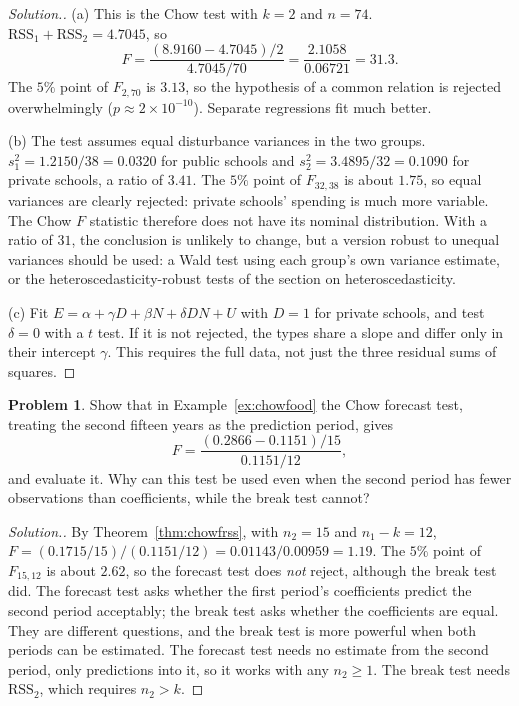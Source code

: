 \documentclass[11pt,a4paper]{article}
\numberwithin{equation}{section}
\theoremstyle{definition}
\newtheorem{problemx}{Problem}[subsection]
\newenvironment{problem}{\begin{problemx}}{\end{problemx}}
\newenvironment{solution}
  {\renewcommand{\qedsymbol}{}\begin{proof}[\textit{Solution}.]}
  {\end{proof}}
\begin{document}
\begin{solution}
(a) This is the Chow test with $k = 2$ and $n = 74$. $\text{RSS}_1 + \text{RSS}_2 = 4.7045$, so
\[
F = \frac{(8.9160 - 4.7045)/2}{4.7045/70} = \frac{2.1058}{0.06721} = 31.3 .
\]
The $5\%$ point of $F_{2,70}$ is $3.13$, so the hypothesis of a common relation is rejected overwhelmingly ($p \approx 2 \times 10^{-10}$). Separate regressions
fit much better.

(b) The test assumes equal disturbance variances in the two groups. $s_1^2 = 1.2150/38 = 0.0320$ for public schools and $s_2^2 = 3.4895/32 = 0.1090$ for private
schools, a ratio of $3.41$. The $5\%$ point of $F_{32,38}$ is about $1.75$, so equal variances are clearly rejected: private schools' spending is much more
variable. The Chow $F$ statistic therefore does not have its nominal distribution. With a ratio of $31$, the conclusion is unlikely to change, but a
version robust to unequal variances should be used: a Wald test using each group's own variance estimate, or the heteroscedasticity-robust tests
of the section on heteroscedasticity.

(c) Fit $E = \alpha + \gamma D + \beta N + \delta DN + U$ with $D = 1$ for private schools, and test $\delta = 0$ with a $t$ test. If it is not rejected, the
types share a slope and differ only in their intercept $\gamma$. This requires the full data, not just the three residual sums of squares.
\end{solution}

\begin{problem}
Show that in Example~\ref{ex:chowfood} the Chow forecast test, treating the second fifteen years as the prediction period, gives
\[
F = \frac{(0.2866 - 0.1151)/15}{0.1151/12} ,
\]
and evaluate it. Why can this test be used even when the second period has fewer observations than coefficients, while the break test cannot?
\end{problem}

\begin{solution}
By Theorem~\ref{thm:chowfrss}, with $n_2 = 15$ and $n_1 - k = 12$, $F = (0.1715/15)/(0.1151/12) = 0.01143/0.00959 = 1.19$. The $5\%$ point of $F_{15,12}$ is about $2.62$, so
the forecast test does \emph{not} reject, although the break test did. The forecast test asks whether the first period's coefficients predict the second
period acceptably; the break test asks whether the coefficients are equal. They are different questions, and the break test is more powerful when
both periods can be estimated. The forecast test needs no estimate from the second period, only predictions into it, so it works with any
$n_2 \geq 1$. The break test needs $\text{RSS}_2$, which requires $n_2 > k$.
\end{solution}
\end{document}
